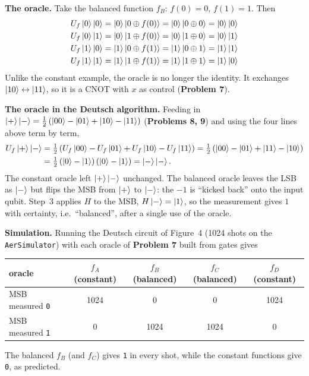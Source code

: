 \documentclass[a4paper, 10pt]{article}
\begin{document}
\begin{solution}
	\noindent \textbf{The oracle.} Take the balanced function \( f_B \): \( f(0) = 0 \), \( f(1) = 1 \). Then
	\begin{align*}
		U_f\ket{0}\ket{0} & = \ket{0}\ket{0 \oplus f(0)} = \ket{0}\ket{0 \oplus 0} = \ket{0}\ket{0} \\
		U_f\ket{0}\ket{1} & = \ket{0}\ket{1 \oplus f(0)} = \ket{0}\ket{1 \oplus 0} = \ket{0}\ket{1} \\
		U_f\ket{1}\ket{0} & = \ket{1}\ket{0 \oplus f(1)} = \ket{1}\ket{0 \oplus 1} = \ket{1}\ket{1} \\
		U_f\ket{1}\ket{1} & = \ket{1}\ket{1 \oplus f(1)} = \ket{1}\ket{1 \oplus 1} = \ket{1}\ket{0}
	\end{align*}
	Unlike the constant example, the oracle is no longer the identity. It exchanges \( \ket{10} \leftrightarrow \ket{11} \), so it is a CNOT with \( x \) as control (\textbf{Problem 7}).

	\noindent \textbf{The oracle in the Deutsch algorithm.} Feeding in \( \ket{+}\ket{-} = \tfrac{1}{2}\left(\ket{00} - \ket{01} + \ket{10} - \ket{11}\right) \) (\textbf{Problems 8, 9}) and using the four lines above term by term,
	\begin{align*}
		U_f\ket{+}\ket{-}
		 & = \tfrac{1}{2}\left(U_f\ket{00} - U_f\ket{01} + U_f\ket{10} - U_f\ket{11}\right)
		= \tfrac{1}{2}\left(\ket{00} - \ket{01} + \ket{11} - \ket{10}\right)                \\
		 & = \tfrac{1}{2}\left(\ket{0} - \ket{1}\right)\left(\ket{0} - \ket{1}\right)
		= \ket{-}\ket{-}.
	\end{align*}
	The constant oracle left \( \ket{+}\ket{-} \) unchanged. The balanced oracle leaves the LSB as \( \ket{-} \) but flips the MSB from \( \ket{+} \) to \( \ket{-} \): the \( -1 \) is ``kicked back'' onto the input qubit.
	Step~3 applies \( H \) to the MSB, \( H\ket{-} = \ket{1} \), so the measurement gives \( 1 \) with certainty, i.e.\ ``balanced'', after a single use of the oracle.

	\noindent \textbf{Simulation.} Running the Deutsch circuit of Figure~4 (1024 shots on the \texttt{AerSimulator}) with each oracle of \textbf{Problem 7} built from gates gives
	\begin{center}
		\begin{tabular}{lcccc}
			\toprule
			oracle                  & \( f_A \) (constant) & \( f_B \) (balanced) & \( f_C \) (balanced) & \( f_D \) (constant) \\
			\midrule
			MSB measured \texttt{0} & 1024                 & 0                    & 0                    & 1024                 \\
			MSB measured \texttt{1} & 0                    & 1024                 & 1024                 & 0                    \\
			\bottomrule
		\end{tabular}
	\end{center}
	The balanced \( f_B \) (and \( f_C \)) gives \texttt{1} in every shot, while the constant functions give \texttt{0}, as predicted.
\end{solution}
\end{document}
